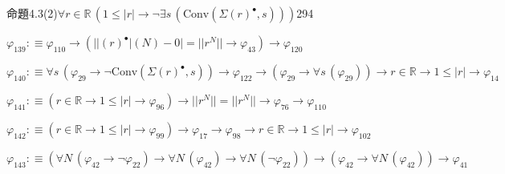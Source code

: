 \begin{fullproof}{命題4.3(2)}{$\forall r \in \mathbb{R}\,(1 \leq \lvert r \rvert \to \neg \exists s\,(\mathrm{Conv}(\Sigma {(r)^{\bullet}},s)))$}{294}
\begin{abbrevlist}
\item $\varphi_{139} :\equiv \varphi_{110} \to (\lvert \lvert {(r)^{\bullet}} \rvert(N) - 0 \rvert = \lvert \lvert {{r}^{N}} \rvert \rvert \to \varphi_{43}) \to \varphi_{120}$
\item $\varphi_{140} :\equiv \forall s\,(\varphi_{29} \to \neg \mathrm{Conv}(\Sigma {(r)^{\bullet}},s)) \to \varphi_{122} \to (\varphi_{29} \to \forall s\,(\varphi_{29})) \to r \in \mathbb{R} \to 1 \leq \lvert r \rvert \to \varphi_{14}$
\item $\varphi_{141} :\equiv (r \in \mathbb{R} \to 1 \leq \lvert r \rvert \to \varphi_{96}) \to \lvert \lvert {{r}^{N}} \rvert \rvert = \lvert \lvert {{r}^{N}} \rvert \rvert \to \varphi_{76} \to \varphi_{110}$
\item $\varphi_{142} :\equiv (r \in \mathbb{R} \to 1 \leq \lvert r \rvert \to \varphi_{99}) \to \varphi_{17} \to \varphi_{98} \to r \in \mathbb{R} \to 1 \leq \lvert r \rvert \to \varphi_{102}$
\item $\varphi_{143} :\equiv (\forall N\,(\varphi_{42} \to \neg \varphi_{22}) \to \forall N\,(\varphi_{42}) \to \forall N\,(\neg \varphi_{22})) \to (\varphi_{42} \to \forall N\,(\varphi_{42})) \to \varphi_{41}$
\end{abbrevlist}
\end{fullproof}
